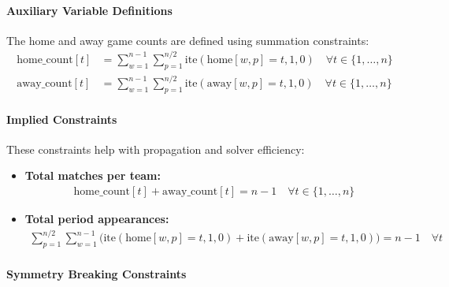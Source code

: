 \documentclass[11pt]{article}
\begin{document}
\paragraph{Auxiliary Variable Definitions}

The home and away game counts are defined using summation constraints:
\begin{align}
\text{home\_count}[t] &= \sum_{w=1}^{n-1} \sum_{p=1}^{n/2} \text{ite}(\text{home}[w,p] = t, 1, 0) \quad \forall t \in \{1, \ldots, n\} \\
\text{away\_count}[t] &= \sum_{w=1}^{n-1} \sum_{p=1}^{n/2} \text{ite}(\text{away}[w,p] = t, 1, 0) \quad \forall t \in \{1, \ldots, n\}
\end{align}

\paragraph{Implied Constraints}

These constraints help with propagation and solver efficiency:
\begin{itemize}
    \item \textbf{Total matches per team:}
    \begin{align}
        \text{home\_count}[t] + \text{away\_count}[t] = n - 1 \quad \forall t \in \{1, \ldots, n\}
    \end{align}

    \item \textbf{Total period appearances:}
    \begin{align}
        \sum_{p=1}^{n/2} \sum_{w=1}^{n-1} \Big( \text{ite}(\text{home}[w,p] = t, 1, 0) + \text{ite}(\text{away}[w,p] = t, 1, 0) \Big) = n-1 \quad \forall t
    \end{align}
\end{itemize}

\paragraph{Symmetry Breaking Constraints}
\end{document}
